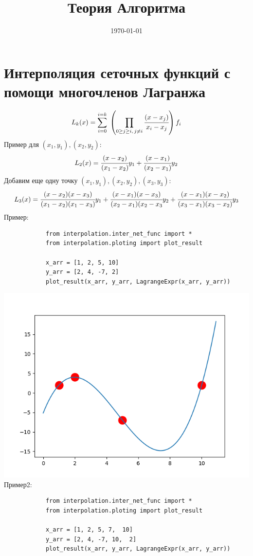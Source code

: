 \documentclass[12pt]{article} %
\title{Теория Алгоритма} %
\date{\today} %
\begin{document}
 	
 		\section{Интерполяция сеточных функций с помощи многочленов Лагранжа}
 		\[L_k(x) = \sum_{i=0}^{i=k}\;\left( \prod_{0 \geq j \geq i,\, j \neq i} \cfrac{(x - x_j)}{x_i - x_j} \right) f_i \]
 		Пример для $(x_1, y_1), (x_2, y_2)$:
 		\[L_2(x) = \cfrac{(x - x_2)}{(x_1 - x_2)} y_1 + \cfrac{(x - x_1)}{(x_2 - x_1)} y_2 \]
 		Добавим еще одну точку $(x_1, y_1), (x_2, y_2), (x_3, y_3)$:
 		\[L_3(x) = \cfrac{(x - x_2)(x - x_3)}{(x_1 - x_2)(x_1 - x_3)} y_1 + \cfrac{(x - x_1)(x - x_3)}{(x_2 - x_1)(x_2 - x_3} y_2  + \cfrac{(x - x_1)(x - x_2)}{(x_3 - x_1)(x_3 - x_2)} y_3 \]
 		Пример:
 		\begin{verbatim}
 			from interpolation.inter_net_func import *
 			from interpolation.ploting import plot_result
 			
	 		x_arr = [1, 2, 5, 10]
	 		y_arr = [2, 4, -7, 2]
	 		plot_result(x_arr, y_arr, LagrangeExpr(x_arr, y_arr))
 		\end{verbatim}
 		\includegraphics{1}
 		Пример2:
 		\begin{verbatim}
 			from interpolation.inter_net_func import *
 			from interpolation.ploting import plot_result
 			
 			x_arr = [1, 2, 5, 7,  10]
 			y_arr = [2, 4, -7, 10,  2]
 			plot_result(x_arr, y_arr, LagrangeExpr(x_arr, y_arr))
 		\end{verbatim}
\end{document}
